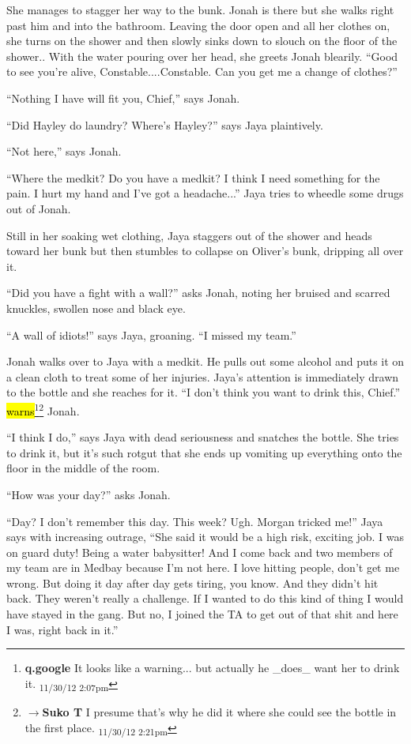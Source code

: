 She manages to stagger her way to the bunk.  Jonah is there but she walks right past him and into the bathroom.  Leaving the door open and all her clothes on, she turns on the shower and then slowly sinks down to slouch on the floor of the shower..  With the water pouring over her head, she greets Jonah blearily.  ``Good to see you're alive, Constable....Constable.  Can you get me a change of clothes?''

``Nothing I have will fit you, Chief,'' says Jonah.

``Did Hayley do laundry?  Where's Hayley?'' says Jaya plaintively.

``Not here,'' says Jonah.

``Where the medkit?  Do you have a medkit?  I think I need something for the pain.  I hurt my hand and I've got a headache...'' Jaya tries to wheedle some drugs out of Jonah.

Still in her soaking wet clothing, Jaya staggers out of the shower and heads toward her bunk but then stumbles to collapse on Oliver's bunk, dripping all over it.

``Did you have a fight with a wall?'' asks Jonah, noting her bruised and scarred knuckles, swollen nose and black eye.

``A wall of idiots!'' says Jaya, groaning.  ``I missed my team.''

Jonah walks over to Jaya with a medkit.  He pulls out some alcohol and puts it on a clean cloth to treat some of her injuries. Jaya's attention is immediately drawn to the bottle and she reaches for it.  ``I don't think you want to drink this, Chief.'' \hl{warns}\footnote{\textbf{q.google }It looks like a warning... but actually he \_does\_ want her to drink it. \textsubscript{11/30/12 2:07pm}}\footnote{$\rightarrow$\textbf{Suko T }I presume that's why he did it where she could see the bottle in the first place. \textsubscript{11/30/12 2:21pm}} Jonah.

``I think I do,'' says Jaya with dead seriousness and snatches the bottle.  She tries to drink it, but it's such rotgut that she ends up vomiting up everything onto the floor in the middle of the room.



``How was your day?'' asks Jonah.

``Day?  I don't remember this day.  This week?  Ugh.  Morgan tricked me!'' Jaya says with increasing outrage, ``She said it would be a high risk, exciting job.  I was on guard duty!  Being a water babysitter!  And I come back and two members of my team are in Medbay because I'm not here. I love hitting people, don't get me wrong.  But doing it day after day gets tiring, you know.  And they didn't hit back. They weren't really a challenge.  If I wanted to do this kind of thing I would have stayed in the gang. But no, I joined the TA to get out of that shit and here I was, right back in it.''

